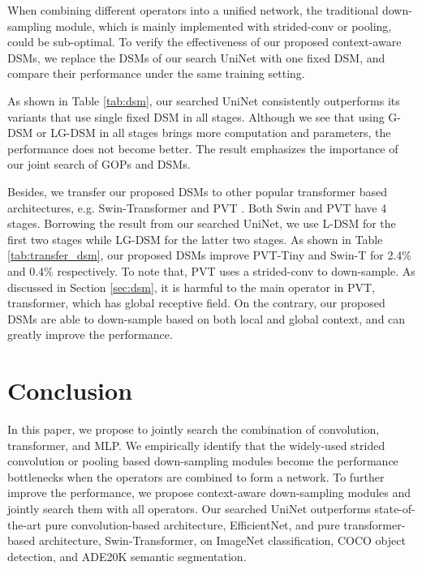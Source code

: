 \documentclass{article} \usepackage{iclr2022_conference,times}
\begin{document}
When combining different operators into a unified network, the traditional down-sampling module, which is mainly implemented with strided-conv or pooling, could be sub-optimal. To verify the effectiveness of our proposed context-aware DSMs, we replace the DSMs of our search UniNet with one fixed DSM, and compare their performance under the same training setting.

As shown in Table \ref{tab:dsm}, our searched UniNet consistently outperforms its variants that use single fixed DSM in all stages. Although we see that using G-DSM or LG-DSM in all stages brings more computation and parameters, the performance does not become better. The result emphasizes the importance of our joint search of GOPs and DSMs.

Besides, we transfer our proposed DSMs to other popular transformer based architectures, e.g. Swin-Transformer \citep{swin} and PVT \citep{pvt}. Both Swin and PVT have 4 stages. Borrowing the result from our searched UniNet, we use L-DSM for the first two stages while LG-DSM for the latter two stages. As shown in Table \ref{tab:transfer_dsm}, our proposed DSMs improve PVT-Tiny and Swin-T for 2.4\% and 0.4\% respectively. To note that, PVT uses a strided-conv to down-sample. As discussed in Section \ref{sec:dsm}, it is harmful to the main operator in PVT, transformer, which has global receptive field. On the contrary, our proposed DSMs are able to down-sample based on both local and global context, and can greatly improve the performance.






\section{Conclusion}
\label{conclusion}

In this paper, we propose to jointly search the combination of convolution, transformer, and MLP. We empirically identify that the widely-used strided convolution or pooling based down-sampling modules become the performance bottlenecks when the operators are combined to form a network. To further improve the performance, we propose context-aware down-sampling modules and jointly search them with all operators. Our searched UniNet outperforms state-of-the-art pure convolution-based architecture, EfficientNet, and pure transformer-based architecture, Swin-Transformer, on ImageNet classification, COCO object detection, and ADE20K semantic segmentation.





\end{document}
